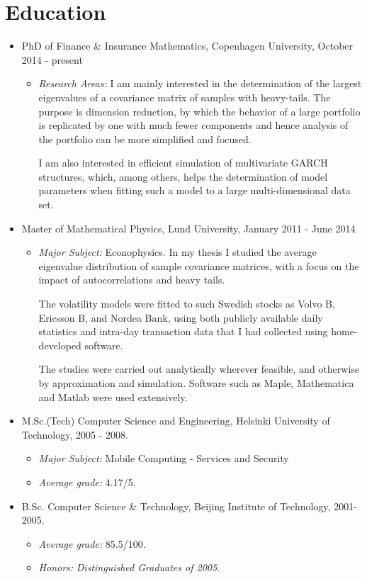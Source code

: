 \documentclass[10pt,letterpaper]{article}
\begin{document}
\section*{Education}
\begin{itemize}
\item PhD of Finance \& Insurance Mathematics, Copenhagen University,
  October 2014 - present
  \begin{itemize}
    \item {\it Research Areas:} I am mainly interested in the
      determination of the largest eigenvalues of a covariance matrix
      of samples with heavy-tails. The purpose is dimension
      reduction, by which the behavior of a large portfolio is
      replicated by one with much fewer components and hence analysis of
      the portfolio can be more simplified and focused.

      I am also interested in efficient simulation of multivariate
      GARCH structures, which, among others, helps the determination of
      model parameters when fitting such a model to a large
      multi-dimensional data set.
  \end{itemize}  

\item Master of Mathematical Physics, Lund University, January 2011 -
  June 2014
  \begin{itemize}
  \item {\it Major Subject:} Econophysics. In my thesis I studied the
    average eigenvalue distribution of sample covariance matrices,
    with a focus on the impact of autocorrelations and heavy tails.

    The volatility models were fitted to such Swedish stocks as Volvo B,
    Ericsson B, and Nordea Bank, using both publicly available daily
    statistics and intra-day transaction data that I had collected
    using home-developed software.

    The studies were carried out analytically wherever feasible, and
    otherwise by approximation and simulation. Software such as Maple,
    Mathematica and Matlab were used extensively.
  \end{itemize}

\item M.Sc.(Tech) Computer Science and Engineering, Helsinki
  University of Technology, 2005 - 2008.
  \begin{itemize}
  \item {\it Major Subject:} Mobile Computing - Services and Security
  \item {\it Average grade:} 4.17/5.
  \end{itemize}

\item B.Sc. Computer Science \& Technology, Beijing Institute of
  Technology, 2001- 2005.
  \begin{itemize}
  \item {\it Average grade:} 85.5/100.
  \item {\it Honors:} \textit{Distinguished Graduates of 2005}.
  \end{itemize}
\end{itemize}
\end{document}
